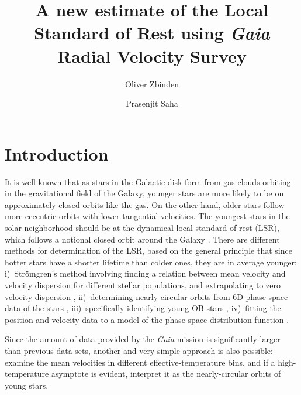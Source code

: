\documentclass{aastex62}
\begin{document}
	
\title{A new estimate of the Local Standard of Rest using \textit{Gaia} Radial Velocity Survey}
	
	
	\author{Oliver Zbinden}
	
	
	\author{Prasenjit Saha}

	
\section{Introduction}\label{intro}
	
It is well known that as stars in the Galactic disk form from gas clouds orbiting in the gravitational field of the Galaxy, younger stars are more likely to be on approximately closed orbits like the gas. On the other hand, older stars follow more eccentric orbits with lower tangential velocities.  The youngest stars in the solar neighborhood should be at the dynamical local standard of rest (LSR), which follows a notional closed orbit around the Galaxy \citep[see e.g.,][]{shu}.  There are different methods for determination of the LSR, based on the general principle that since hotter stars have a shorter lifetime than colder ones, they are in average younger:  i)~Str\"omgren's method involving finding a relation between mean velocity and velocity dispersion for different stellar populations, and extrapolating to zero velocity dispersion \citep[e.g.,][]{ding}, ii)~determining nearly-circular orbits from 6D phase-space data of the stars \citep{francis}, iii)~specifically identifying young OB stars \citep{boby}, iv)~fitting the position and velocity data to a model of the phase-space distribution function \citep{schoenrich}.

Since the amount of data provided by the \textit{Gaia} mission \citep{gaiamission} is significantly larger than previous data sets, another and very simple approach is also possible: examine the mean velocities in different effective-temperature bins, and if a high-temperature asymptote is evident, interpret it as the nearly-circular orbits of young stars.
	
\end{document}

